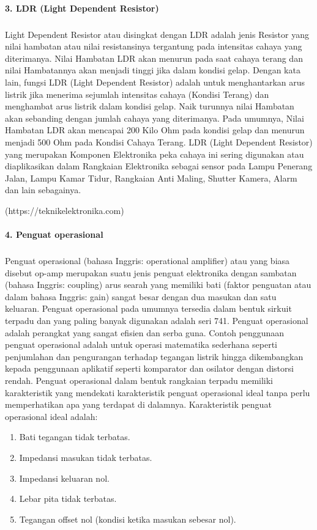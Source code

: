 \documentclass[12pt,a4paper]{article}
\begin{document}
\paragraph{ }
\textbf{3. LDR (Light Dependent Resistor)}
\subparagraph{ }
	Light Dependent Resistor atau disingkat dengan LDR adalah jenis Resistor yang nilai hambatan atau nilai resistansinya tergantung pada intensitas cahaya yang diterimanya. Nilai Hambatan LDR akan menurun pada saat cahaya terang dan nilai Hambatannya akan menjadi tinggi jika dalam kondisi gelap. Dengan kata lain, fungsi LDR (Light Dependent Resistor) adalah untuk menghantarkan arus listrik jika menerima sejumlah intensitas cahaya (Kondisi Terang) dan menghambat arus listrik dalam kondisi gelap.
	Naik turunnya nilai Hambatan akan sebanding dengan jumlah cahaya yang diterimanya. Pada umumnya, Nilai Hambatan LDR akan mencapai 200 Kilo Ohm pada kondisi gelap dan menurun menjadi 500 Ohm pada Kondisi Cahaya Terang.
	LDR (Light Dependent Resistor) yang merupakan Komponen Elektronika peka cahaya ini sering digunakan atau diaplikasikan dalam Rangkaian Elektronika sebagai sensor pada Lampu Penerang Jalan, Lampu Kamar Tidur, Rangkaian Anti Maling, Shutter Kamera, Alarm dan lain sebagainya.

\begin{flushright}
(https://teknikelektronika.com) 
\end{flushright}

\paragraph{ }
\textbf{4. Penguat operasional}
\subparagraph{ }
	Penguat operasional (bahasa Inggris: operational amplifier) atau yang biasa disebut op-amp merupakan suatu jenis penguat elektronika dengan sambatan (bahasa Inggris: coupling) arus searah yang memiliki bati (faktor penguatan atau dalam bahasa Inggris: gain) sangat besar dengan dua masukan dan satu keluaran. Penguat operasional pada umumnya tersedia dalam bentuk sirkuit terpadu dan yang paling banyak digunakan adalah seri 741.
Penguat operasional adalah perangkat yang sangat efisien dan serba guna. Contoh penggunaan penguat operasional adalah untuk operasi matematika sederhana seperti penjumlahan dan pengurangan terhadap tegangan listrik hingga dikembangkan kepada penggunaan aplikatif seperti komparator dan osilator dengan distorsi rendah.
Penguat operasional dalam bentuk rangkaian terpadu memiliki karakteristik yang mendekati karakteristik penguat operasional ideal tanpa perlu memperhatikan apa yang terdapat di dalamnya. Karakteristik penguat operasional ideal adalah:
	\begin{enumerate}
	\item Bati tegangan tidak terbatas.
	\item Impedansi masukan tidak terbatas.
	\item Impedansi keluaran nol.
	\item Lebar pita tidak terbatas.
	\item Tegangan offset nol (kondisi ketika masukan sebesar nol).
	\end{enumerate}
\end{document}
